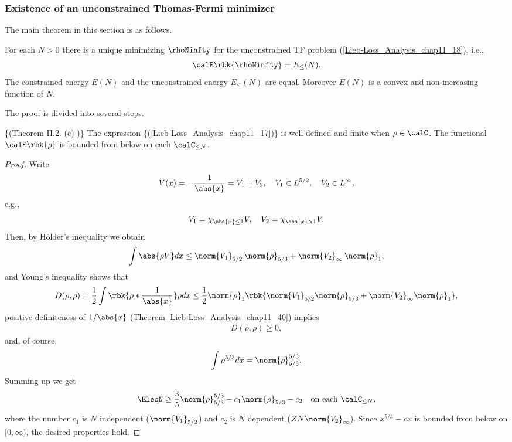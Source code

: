 \documentclass[openany, a4paper, oneside]{jsbook}
\begin{document}
\subsubsection{Existence of an unconstrained Thomas-Fermi minimizer}

The main theorem in this section is as follows.
\begin{thm}\label{Lieb-Loss_Analysis_chap11_33}
 For each $N > 0$ there is a unique minimizing $\rhoNinfty$ for the unconstrained TF problem (\ref{Lieb-Loss_Analysis_chap11_18}), i.e.,
\begin{align}
 \calE \rbk{\rhoNinfty}
 =
 E_{\leq} (N).
\end{align}
The constrained energy $E (N)$ and the unconstrained energy $E_{\leq} (N)$ are equal.
Moreover $E (N)$ is a convex and non-increasing function of $N$.
\end{thm}
The proof is divided into several steps.
\begin{lem}\textup\{(Theorem II.2. (c) \cite{LiebSimon1})\}\label{Lieb-Loss_Analysis_chap11_19}
 The expression \textup\{(\ref{Lieb-Loss_Analysis_chap11_17})\} is well-defined and finite when $\rho \in \calC$.
 The functional $\calE \rbk{\rho}$ is bounded from below on each $\calC_{\leq N}$.
\end{lem}
\begin{proof}
Write
\begin{align}
 V (x)
 =
 -\frac{1}{\abs{x}}
 =
 V_1 + V_2, \quad V_1 \in L^{5/2}, \quad V_2 \in L^{\infty},
\end{align}
e.g.,
\begin{align}
 V_1 = \chi_{\abs{x} \leq 1} V, \quad
 V_2 = \chi_{\abs{x} > 1} V.
\end{align}
Then, by H\"older's inequality we obtain
\begin{align}
 \int \abs{\rho V} dx
 \leq
 \norm{V_1}_{5/2} \, \norm{\rho}_{5/3} + \norm{V_2}_{\infty} \, \norm{\rho}_1,
\end{align}
and Young's inequality shows that
\begin{align}
 D (\rho, \rho)
 =
 \frac{1}{2} \int \rbk{\rho * \frac{1}{\abs{x}}} \rho dx
 \leq
 \frac{1}{2} \norm{\rho}_1 \rbk{\norm{V_1}_{5/2} \norm{\rho}_{5/3} + \norm{V_2}_{\infty} \norm{\rho}_1},
\end{align}
positive definiteness of $1/\abs{x}$ (Theorem \ref{Lieb-Loss_Analysis_chap11_40}) implies
\begin{align}
 D (\rho, \rho)
 \geq 0,
\end{align}
and, of course,
\begin{align}
 \int \rho^{5/3} dx
 =
 \norm{\rho}_{5/3}^{5/3}.
\end{align}
Summing up we get
\begin{align}
 \EleqN
 \geq
 \frac{3}{5} \norm{\rho}_{5/3}^{5/3} - c_1 \norm{\rho}_{5/3} - c_2 \quad \text{on each } \calC_{\leq N}, \label{Lieb-Loss_Analysis_chap11_21}
\end{align}
where the number $c_1$ is $N$ independent ($\norm{V_1}_{5/2}$) and $c_2$ is $N$ dependent ($ZN \norm{V_2}_{\infty}$).
Since $x^{5/3} - c x$ is bounded from below on $[0, \infty)$, the desired properties hold.
\end{proof}
\end{document}
